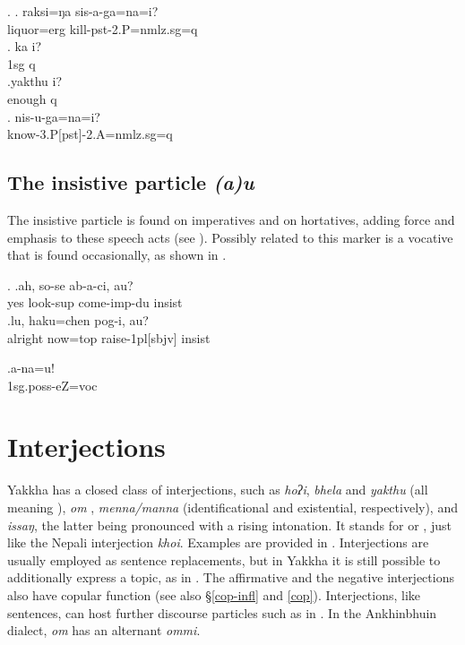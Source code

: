 	\ex. \ag.  raksi=ŋa  sis-a-ga=na=i? \\
		liquor{\sc =erg} kill{\sc [3sg.A]-pst-2.P=nmlz.sg=q}\\
		\bg. ka i? \\
		{\sc 1sg} {\sc q}\\
		\rede{I?}
		\bg.yakthu i?\\
		enough {\sc q}\\
		 \source{36\_cvs\_06.248 }
\bg. nis-u-ga=na=i?\\
	know{\sc -3.P[pst]-2.A=nmlz.sg=q}\\
 
 
 
\subsection{The insistive particle \emph{(a)u}}  

The insistive particle is found on imperatives and on hortatives, adding force and emphasis to these speech acts (see \Next). 
Possibly related to this marker is a  vocative that is found occasionally, as shown in \NNext. 

\ex. \ag.ah,    so-se           ab-a-ci,              au?\\
yes look{\sc -sup} come{\sc -imp-du} {\sc insist}\\
 
\bg.lu,     haku=chen   pog-i,         au?\\
alright now{\sc =top} raise{\sc -1pl[sbjv]} {\sc insist}\\
 

 
 \exg.a-na=u!\\
 {\sc 1sg.poss-}eZ=voc\\



\section{Interjections}\label{interjections}
 
 
 Yakkha has a closed class of interjections, such as \emph{hoʔi}, \emph{bhela} and \emph{yakthu} (all meaning ), \emph{om} , \emph{menna/manna}  (identificational and existential, respectively), and \emph{issaŋ}, the latter being pronounced with a rising intonation. It stands for   or , just like the Nepali interjection \emph{khoi}. Examples are provided in \Next. Interjections are usually employed as sentence replacements, but in Yakkha it is still possible to additionally  express a topic, as in \Next[a]. The affirmative and the negative interjections also have copular function (see also §\ref{cop-infl} and \ref{cop}). Interjections, like sentences, can host further discourse particles such as in \Next[d]. In the Ankhinbhuin dialect, \emph{om} has an alternant \emph{ommi}. 
 
